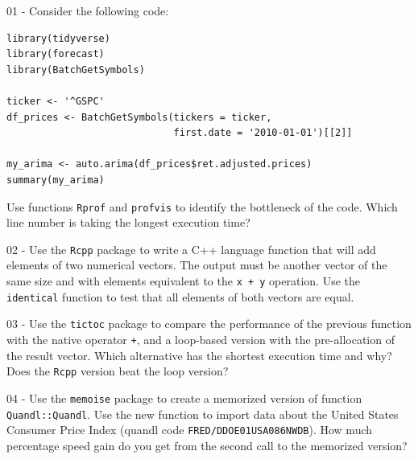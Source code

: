 \documentclass[
  12pt,
]{book}
\begin{document}
01 -
Consider the following code:

\begin{verbatim}
library(tidyverse)
library(forecast)
library(BatchGetSymbols)

ticker <- '^GSPC'
df_prices <- BatchGetSymbols(tickers = ticker, 
                             first.date = '2010-01-01')[[2]]

my_arima <- auto.arima(df_prices$ret.adjusted.prices)
summary(my_arima)
\end{verbatim}

Use functions \texttt{Rprof} and \texttt{profvis} to identify the bottleneck of the code. Which line number is taking the longest execution time?

02 -
Use the \texttt{Rcpp} package to write a C++ language function that will add elements of two numerical vectors. The output must be another vector of the same size and with elements equivalent to the \texttt{x\ +\ y} operation. Use the \texttt{identical} function to test that all elements of both vectors are equal.

03 -
Use the \texttt{tictoc} package to compare the performance of the previous function with the native operator \texttt{+}, and a loop-based version with the pre-allocation of the result vector. Which alternative has the shortest execution time and why? Does the \texttt{Rcpp} version beat the loop version?

04 -
Use the \texttt{memoise} package to create a memorized version of function \texttt{Quandl::Quandl}. Use the new function to import data about the United States Consumer Price Index (quandl code \texttt{\textquotesingle{}FRED/DDOE01USA086NWDB\textquotesingle{}}). How much percentage speed gain do you get from the second call to the memorized version?

  

\printindex
\end{document}
